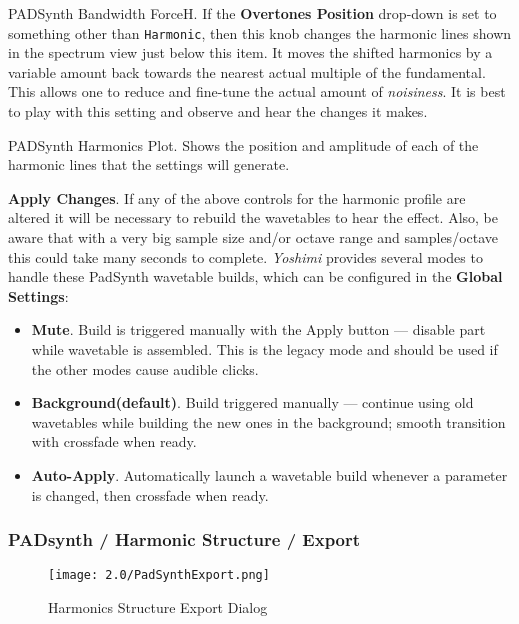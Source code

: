    PADSynth Bandwidth ForceH.
   If the \textbf{Overtones Position} drop-down is set to something other than
   \texttt{Harmonic}, then this knob changes the harmonic lines shown in the
   spectrum view just below this item.
   It moves the shifted harmonics by a variable amount back towards the nearest
   actual multiple of the fundamental. This allows one to reduce and fine-tune the
   actual amount of \textsl{noisiness}.
   It is best to play with this setting and observe and hear the changes it
   makes.

   PADSynth Harmonics Plot.
   Shows the position and amplitude of each of the harmonic lines that the
   settings will generate.

   \textbf{Apply Changes}.
   If any of the above controls for the harmonic profile are altered it will be
   necessary to rebuild the wavetables to hear the effect. Also, be aware that
   with a very big sample size and/or octave range and samples/octave this could
   take many seconds to complete.
   \textsl{Yoshimi} provides several modes to handle these
   PadSynth wavetable builds, which can be configured in the
   \textbf{Global Settings}:

   \begin{itemize}
      \item \textbf{Mute}.
         Build is triggered manually with the Apply button — disable part while
         wavetable is assembled.  This is the legacy mode and should be used if
         the other modes cause audible clicks.
      \item \textbf{Background(default)}.
         Build triggered manually — continue using old wavetables while building
         the new ones in the background; smooth transition with crossfade when
         ready.
      \item \textbf{Auto-Apply}.
         Automatically launch a wavetable build whenever a parameter is changed,
         then crossfade when ready.
   \end{itemize}

\subsubsection{PADsynth / Harmonic Structure / Export}
\label{subsubsec:padsynth_harmonic_structure_export}

\begin{figure}[H]
   \centering
   \texttt{[image: 2.0/PadSynthExport.png]}
   \caption{Harmonics Structure Export Dialog}
   \label{fig:harmonics_structure_export_dialog}
\end{figure}

